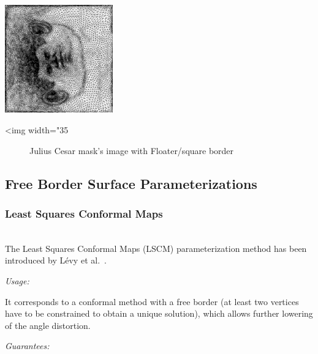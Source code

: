 \begin{center}
    \label{Surface_mesh_parameterization-fig-square_border}
    \begin{ccTexOnly}
        \includegraphics[width=0.35\textwidth]{Surface_mesh_parameterization/square_border}
    \end{ccTexOnly}
    \begin{ccHtmlOnly}
        <img width="35%
    \end{ccHtmlOnly}
    \begin{figure}[h]
        \caption{Julius Cesar mask's image with Floater/square border}
    \end{figure}
\end{center}


\subsection{Free Border Surface Parameterizations}

\subsubsection{Least Squares Conformal Maps}

  \\

The Least Squares Conformal Maps (LSCM) parameterization method has
been introduced by L\'evy et al.~\cite{cgal:lprm-lscm-02}.

\emph{Usage:}

It corresponds to a conformal method with a free border (at least two
vertices have to be constrained to obtain a unique solution), which
allows further lowering of the angle distortion.

\emph{Guarantees:}

